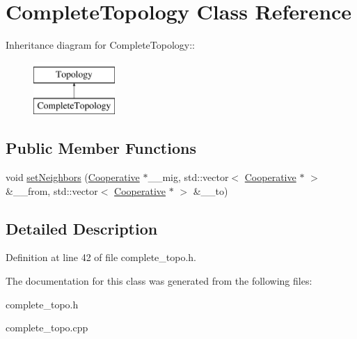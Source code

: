 \hypertarget{classCompleteTopology}{
\section{Complete\-Topology Class Reference}
\label{classCompleteTopology}
}
Inheritance diagram for Complete\-Topology::\begin{figure}[H]
\begin{center}
\leavevmode
\includegraphics[height=2cm]{classCompleteTopology}
\end{center}
\end{figure}
\subsection*{Public Member Functions}
\begin{CompactItemize}
\item 
\hypertarget{classCompleteTopology_9ccbb45bf0cc00aff89fa8594746338c}{
void \hyperlink{classCompleteTopology_9ccbb45bf0cc00aff89fa8594746338c}{set\-Neighbors} (\hyperlink{classCooperative}{Cooperative} $\ast$\_\-\_\-mig, std::vector$<$ \hyperlink{classCooperative}{Cooperative} $\ast$ $>$ \&\_\-\_\-from, std::vector$<$ \hyperlink{classCooperative}{Cooperative} $\ast$ $>$ \&\_\-\_\-to)}
\label{classCompleteTopology_9ccbb45bf0cc00aff89fa8594746338c}

\end{CompactItemize}


\subsection{Detailed Description}




Definition at line 42 of file complete\_\-topo.h.

The documentation for this class was generated from the following files:\begin{CompactItemize}
\item 
complete\_\-topo.h\item 
complete\_\-topo.cpp\end{CompactItemize}
